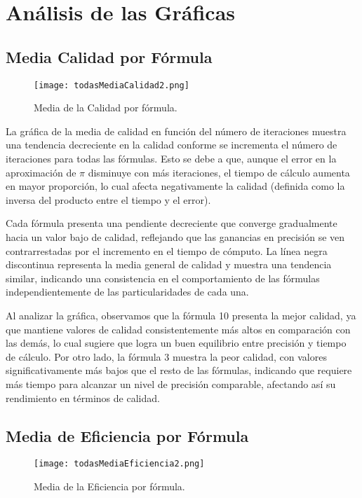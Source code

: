 \documentclass[conference, a4paper]{IEEEtran}
\begin{document}
\section{Análisis de las Gráficas}

\subsection{Media Calidad por Fórmula}

\begin{figure}[h!]
    \centering
    \texttt{[image: todasMediaCalidad2.png]}
    \caption{Media de la Calidad por fórmula.}
    \label{fig:mediaCalidad}
\end{figure}

La gráfica de la media de calidad en función del número de iteraciones muestra una tendencia decreciente en la calidad conforme se incrementa el número de iteraciones para todas las fórmulas. Esto se debe a que, aunque el error en la aproximación de \(\pi\) disminuye con más iteraciones, el tiempo de cálculo aumenta en mayor proporción, lo cual afecta negativamente la calidad (definida como la inversa del producto entre el tiempo y el error).

Cada fórmula presenta una pendiente decreciente que converge gradualmente hacia un valor bajo de calidad, reflejando que las ganancias en precisión se ven contrarrestadas por el incremento en el tiempo de cómputo. La línea negra discontinua representa la media general de calidad y muestra una tendencia similar, indicando una consistencia en el comportamiento de las fórmulas independientemente de las particularidades de cada una.

Al analizar la gráfica, observamos que la fórmula 10 presenta la mejor calidad, ya que mantiene valores de calidad consistentemente más altos en comparación con las demás, lo cual sugiere que logra un buen equilibrio entre precisión y tiempo de cálculo. Por otro lado, la fórmula 3 muestra la peor calidad, con valores significativamente más bajos que el resto de las fórmulas, indicando que requiere más tiempo para alcanzar un nivel de precisión comparable, afectando así su rendimiento en términos de calidad.

\subsection{Media de Eficiencia por Fórmula}

\begin{figure}[h!]
    \centering
    \texttt{[image: todasMediaEficiencia2.png]}
    \caption{Media de la Eficiencia por fórmula.}
    \label{fig:mediaEficiencia}
\end{figure}
\end{document}

